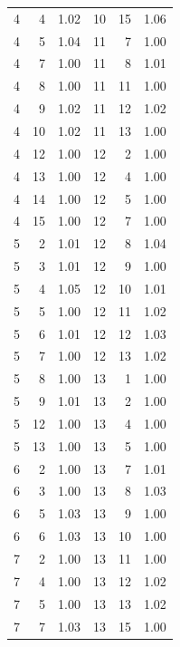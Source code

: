 \begin{table}
\begin{tabular}{|r|r|r||r|r|r|}
      4 &   4 &      1.02 &  10 &  15 &      1.06 \\
      4 &   5 &      1.04 &  11 &   7 &      1.00 \\
      4 &   7 &      1.00 &  11 &   8 &      1.01 \\
      4 &   8 &      1.00 &  11 &  11 &      1.00 \\
      4 &   9 &      1.02 &  11 &  12 &      1.02 \\
      4 &  10 &      1.02 &  11 &  13 &      1.00 \\
      4 &  12 &      1.00 &  12 &   2 &      1.00 \\
      4 &  13 &      1.00 &  12 &   4 &      1.00 \\
      4 &  14 &      1.00 &  12 &   5 &      1.00 \\
      4 &  15 &      1.00 &  12 &   7 &      1.00 \\
      5 &   2 &      1.01 &  12 &   8 &      1.04 \\
      5 &   3 &      1.01 &  12 &   9 &      1.00 \\
      5 &   4 &      1.05 &  12 &  10 &      1.01 \\
      5 &   5 &      1.00 &  12 &  11 &      1.02 \\
      5 &   6 &      1.01 &  12 &  12 &      1.03 \\
      5 &   7 &      1.00 &  12 &  13 &      1.02 \\
      5 &   8 &      1.00 &  13 &   1 &      1.00 \\
      5 &   9 &      1.01 &  13 &   2 &      1.00 \\
      5 &  12 &      1.00 &  13 &   4 &      1.00 \\
      5 &  13 &      1.00 &  13 &   5 &      1.00 \\
      6 &   2 &      1.00 &  13 &   7 &      1.01 \\
      6 &   3 &      1.00 &  13 &   8 &      1.03 \\
      6 &   5 &      1.03 &  13 &   9 &      1.00 \\
      6 &   6 &      1.03 &  13 &  10 &      1.00 \\
      7 &   2 &      1.00 &  13 &  11 &      1.00 \\
      7 &   4 &      1.00 &  13 &  12 &      1.02 \\
      7 &   5 &      1.00 &  13 &  13 &      1.02 \\
      7 &   7 &      1.03 &  13 &  15 &      1.00 \\

\end{tabular}
\end{table}

